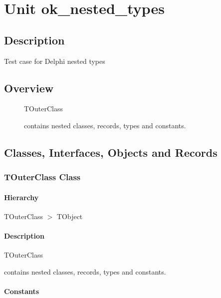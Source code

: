 \documentclass{report}
\begin{document}
\newlength{\tmplength}
\chapter{Unit ok{\_}nested{\_}types}
\section{Description}
Test case for Delphi nested types\hfill\vspace*{1ex}

 


\section{Overview}
\begin{description}
\item[\texttt{\begin{ttfamily}TOuterClass\end{ttfamily} Class}]\begin{ttfamily}TOuterClass\end{ttfamily} contains nested classes, records, types and constants.
\end{description}
\section{Classes, Interfaces, Objects and Records}
\subsection*{TOuterClass Class}
\subsubsection*{\large{\textbf{Hierarchy}}\normalsize\hspace{1ex}\hfill}
TOuterClass {$>$} TObject
\subsubsection*{\large{\textbf{Description}}\normalsize\hspace{1ex}\hfill}
\begin{ttfamily}TOuterClass\end{ttfamily} contains nested classes, records, types and constants.\subsubsection*{\large{\textbf{Constants}}\normalsize\hspace{1ex}\hfill}
\end{document}
